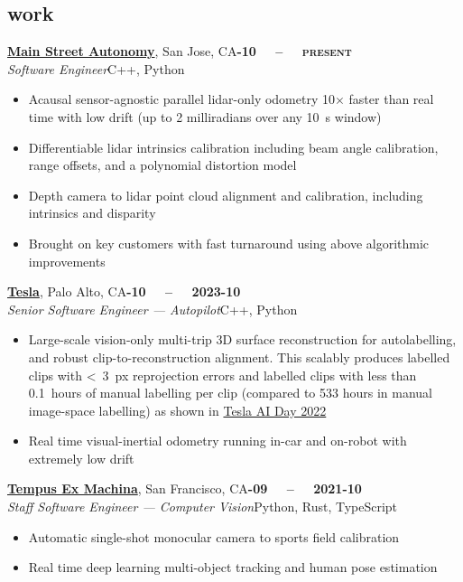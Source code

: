 \documentclass[margin,10pt]{res}
\begin{document}
\begin{resume}
\section{\sc \lsstyle work}
    \href{https://mainstreetautonomy.com}{\textbf{Main Street Autonomy}}, San Jose, CA\hfill \textsc{\bfseries{}-10~~ -- ~~present}\\
    \textit{Software Engineer}\hfill C++, Python
    \vspace{0.5em}
    \begin{itemize}
        \item Acausal sensor-agnostic parallel lidar-only odometry 10$\times$ faster than real time with low drift (up to 2 milliradians over any 10~s window)
        \item Differentiable lidar intrinsics calibration including beam angle calibration, range offsets, and a polynomial distortion model
        \item Depth camera to lidar point cloud alignment and calibration, including intrinsics and disparity
        \item Brought on key customers with fast turnaround using above algorithmic improvements
    \end{itemize}
    
    \href{https://tesla.com/ai}{\textbf{Tesla}}, Palo Alto, CA\hfill \textsc{\bfseries{}-10~~ -- ~~2023-10}\\
    \textit{Senior Software Engineer --- Autopilot}\hfill C++, Python
    \vspace{0.5em}
    \begin{itemize}
        \item Large-scale vision-only multi-trip 3D surface reconstruction for autolabelling, and robust clip-to-reconstruction alignment. This scalably produces labelled clips with <~3~px reprojection errors and labelled clips with less than 0.1~hours of manual labelling per clip (compared to 533 hours in manual image-space labelling) as shown in \href{https://youtu.be/ODSJsviD_SU?t=6034}{Tesla AI Day 2022}
        \item Real time visual-inertial odometry running in-car and on-robot with extremely low drift
    \end{itemize}

    \href{https://tempus-ex.com}{\textbf{Tempus Ex Machina}}, San Francisco, CA\hfill \textsc{\bfseries{}-09~~ -- ~~2021-10}\\
    \textit{Staff Software Engineer --- Computer Vision}\hfill Python, Rust, TypeScript
    \vspace{0.5em}
    \begin{itemize}
        \item Automatic single-shot monocular camera to sports field calibration
        \item Real time deep learning multi-object tracking and human pose estimation
    \end{itemize}


\end{resume}
\end{document}
